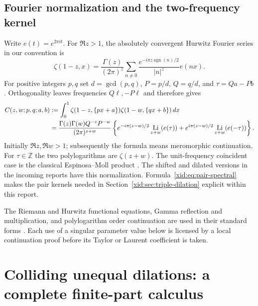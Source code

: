 \documentclass[11pt,a4paper]{article}
\numberwithin{equation}{section}
\theoremstyle{definition}
\theoremstyle{remark}
\DeclareMathOperator{\Li}{Li}
\begin{document}
\subsection{Fourier normalization and the two-frequency kernel}

Write $e(t)=e^{2\pi it}$. For $\Re z>1$, the absolutely convergent
Hurwitz Fourier series in our convention is
\begin{equation}\label{xid:eq:Hurwitz-Fourier}
 \zeta(1-z,x)=\frac{\Gamma(z)}{(2\pi)^z}
 \sum_{n\ne0}\frac{e^{-i\pi z\operatorname{sgn}(n)/2}}{|n|^z}e(nx).
\end{equation}
For positive integers $p,q$ set $d=\gcd(p,q)$,
$P=p/d$, $Q=q/d$, and $\tau=Qa-Pb$. Orthogonality leaves
frequencies $Q\ell,-P\ell$ and therefore gives
\begin{align}
 C(z,w;p,q;a,b)
 &: =\int_0^1\zeta(1-z,\{px+a\})
                  \zeta(1-w,\{qx+b\})\,dx\notag\\
 &=\frac{\Gamma(z)\Gamma(w)Q^{-z}P^{-w}}{(2\pi)^{z+w}}
 \left\{e^{-i\pi(z-w)/2}\Li_{z+w}(e(\tau))
       +e^{i\pi(z-w)/2}\Li_{z+w}(e(-\tau))\right\}.
 \label{xid:eq:pair-spectral}
\end{align}
Initially $\Re z,\Re w>1$; subsequently the formula means
meromorphic continuation. For $\tau\in\mathbb Z$ the two
polylogarithms are $\zeta(z+w)$. The unit-frequency coincident case
is the classical Espinosa--Moll product \cite[Theorem 3.1]{EspinosaMoll1}.
The shifted and dilated versions in the incoming reports have this
normalization. Formula~\eqref{xid:eq:pair-spectral} makes the pair kernels
needed in Section~\ref{xid:sec:triple-dilation} explicit within this report.

The Riemann and Hurwitz functional equations, Gamma reflection and
multiplication, and polylogarithm order continuation are used in their
standard forms \cite{DLMFhurwitz,wat:DLMF}. Each use of a singular
parameter value below is licensed by a local continuation proof before
its Taylor or Laurent coefficient is taken.




\section{Colliding unequal dilations: a complete finite-part calculus}
\label{xid:cld:section}
\end{document}
